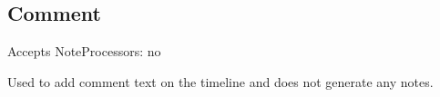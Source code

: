 \subsection{Comment}\label{comment}

Accepts NoteProcessors: no

Used to add comment text on the timeline and does not generate any
notes.
